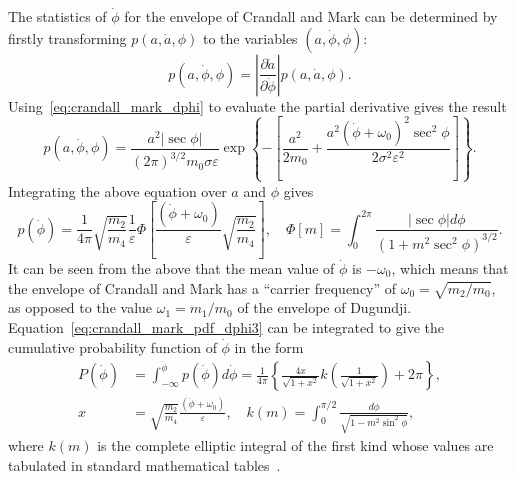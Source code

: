 \documentclass[12pt]{article}
\theoremstyle{plain}
\theoremstyle{definition}
\theoremstyle{remark}
\begin{document}
The statistics of $\dot{\phi}$ for the envelope of Crandall and Mark can be determined by firstly transforming $p(a, \dot{a}, \phi)$ to the variables $(a, \dot{\phi}, \phi)$:
\begin{equation}
    p(a, \dot{\phi}, \phi) = \left| \frac{\partial \dot{a}}{\partial \dot{\phi}} \right| p(a, \dot{a}, \phi).
    \label{eq:crandall_mark_pdf_dphi}
\end{equation}
Using~\eqref{eq:crandall_mark_dphi} to evaluate the partial derivative gives the result
\begin{equation}
    p(a, \dot{\phi}, \phi) = \frac{a^2 |\sec \phi|}{(2\pi)^{3/2} m_0 \sigma \varepsilon} \exp \left\{ -\left[ \frac{a^2}{2m_0} + \frac{a^2 (\dot{\phi} + \omega_0)^2 \sec^2 \phi}{2 \sigma^2 \varepsilon^2} \right] \right\}.
    \label{eq:crandall_mark_pdf_dphi2}
\end{equation}
Integrating the above equation over $a$ and $\phi$ gives
\begin{equation}
    p(\dot{\phi}) = \frac{1}{4\pi} \sqrt{\frac{m_2}{m_4}} \frac{1}{\varepsilon} \Phi \left[ \frac{(\dot{\phi} + \omega_0)}{\varepsilon} \sqrt{\frac{m_2}{m_4}} \right], \quad \Phi[m] = \int_0^{2\pi} \frac{|\sec \phi| d\phi}{(1 + m^2 \sec^2 \phi)^{3/2}}.
    \label{eq:crandall_mark_pdf_dphi3}
\end{equation}
It can be seen from the above that the mean value of $\dot{\phi}$ is $-\omega_0$, which means that the envelope of Crandall and Mark has a ``carrier frequency'' of $\omega_0 = \sqrt{m_2 / m_0}$, as opposed to the value $\omega_1 = m_1 / m_0$ of the envelope of Dugundji. Equation~\eqref{eq:crandall_mark_pdf_dphi3} can be integrated to give the cumulative probability function of $\dot{\phi}$ in the form
\begin{align}
    P(\dot{\phi}) &= \int_{-\infty}^{\dot{\phi}} p(\dot{\phi}) d\dot{\phi} = \frac{1}{4\pi} \left\{ \frac{4x}{\sqrt{1 + x^2}} k \left( \frac{1}{\sqrt{1 + x^2}} \right) + 2\pi \right\}, \label{eq:crandall_mark_cdf} \\
    x &= \sqrt{\frac{m_2}{m_4}} \frac{(\dot{\phi} + \omega_0)}{\varepsilon}, \quad k(m) = \int_0^{\pi/2} \frac{d\phi}{\sqrt{1 - m^2 \sin^2 \phi}}, \label{eq:crandall_mark_elliptic}
\end{align}
where $k(m)$ is the complete elliptic integral of the first kind whose values are tabulated in standard mathematical tables~\cite{abramowitz1965}.
\end{document}
